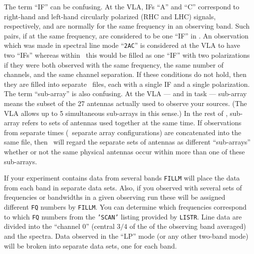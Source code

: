      The term ``IF'' can be confusing.  At the VLA, IFs ``A'' and
``C'' correspond to right-hand and left-hand circularly polarized (RHC
and LHC) signals, respectively, and are normally for the same
frequency in an observing band.  Such pairs, if at the same frequency,
are considered to be one ``IF'' in \hbox{\AIPS}.   An observation
which was made in spectral line mode ``{\tt 2AC}'' is considered at
the VLA to have two ``IFs'' whereas within \AIPS\ this would be filled
as one ``IF'' with two polarizations if they were both observed with
the same frequency, the same number of channels, and the same channel
separation.  If these conditions do not hold, then they are filled
into separate \uv\ files, each with a single IF and a single
polarization.  The term ``sub-array'' is also confusing.  At the VLA
--- and in task {\tt {}} --- sub-array means the subset of
the 27 antennas actually used to observe your sources.  (The VLA
allows up to 5 simultaneous sub-arrays in this sense.)  In the rest of
\AIPS, sub-array refers to sets of antennas used together at the same
time. If observations from separate times (\eg\ separate array
configurations) are concatenated into the same file, then \AIPS\ will
regard the separate sets of antennas as different ``sub-arrays''
whether or not the same physical antennas occur within more than one
of these sub-arrays.

     If your experiment contains data from several bands {\tt FILLM}
will place the data from each band in separate data sets.  Also, if
you observed with several sets of frequencies or bandwidths in a given
observing run these will be assigned different {\tt FQ} numbers by
\hbox{{\tt FILLM}}.  You can determine which frequencies correspond to
which {\tt FQ} numbers from the {\tt 'SCAN'} listing provided by
\hbox{{\tt LISTR}}.  Line data are divided into the ``channel 0''
(central $3/4$ of the of the observing band averaged) and the spectra.
Data observed in the ``LP'' mode (or any other two-band mode) will be
broken into separate data sets, one for each band.


